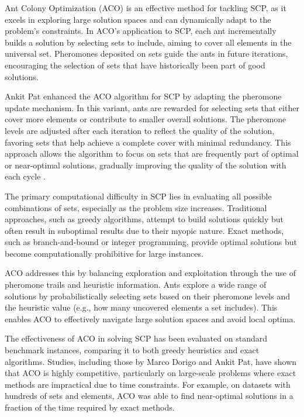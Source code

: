 Ant Colony Optimization (ACO) is an effective method for tackling SCP, as it excels in exploring large solution spaces and can dynamically adapt to the problem’s constraints. In ACO's application to SCP, each ant incrementally builds a solution by selecting sets to include, aiming to cover all elements in the universal set. Pheromones deposited on sets guide the ants in future iterations, encouraging the selection of sets that have historically been part of good solutions.

Ankit Pat enhanced the ACO algorithm for SCP by adapting the pheromone update mechanism\cite{Pat2014}. In this variant, ants are rewarded for selecting sets that either cover more elements or contribute to smaller overall solutions. The pheromone levels are adjusted after each iteration to reflect the quality of the solution, favoring sets that help achieve a complete cover with minimal redundancy. This approach allows the algorithm to focus on sets that are frequently part of optimal or near-optimal solutions, gradually improving the quality of the solution with each cycle \cite{Pat2014}.

The primary computational difficulty in SCP lies in evaluating all possible combinations of sets, especially as the problem size increases. Traditional approaches, such as greedy algorithms, attempt to build solutions quickly but often result in suboptimal results due to their myopic nature. Exact methods, such as branch-and-bound or integer programming, provide optimal solutions but become computationally prohibitive for large instances.

ACO addresses this by balancing exploration and exploitation through the use of pheromone trails and heuristic information. Ants explore a wide range of solutions by probabilistically selecting sets based on their pheromone levels and the heuristic value (e.g., how many uncovered elements a set includes). This enables ACO to effectively navigate large solution spaces and avoid local optima.

The effectiveness of ACO in solving SCP has been evaluated on standard benchmark instances, comparing it to both greedy heuristics and exact algorithms. Studies, including those by Marco Dorigo and Ankit Pat, have shown that ACO is highly competitive, particularly on large-scale problems where exact methods are impractical due to time constraints\cite{Pat2014,Dorigo2004}. For example, on datasets with hundreds of sets and elements, ACO was able to find near-optimal solutions in a fraction of the time required by exact methods.

